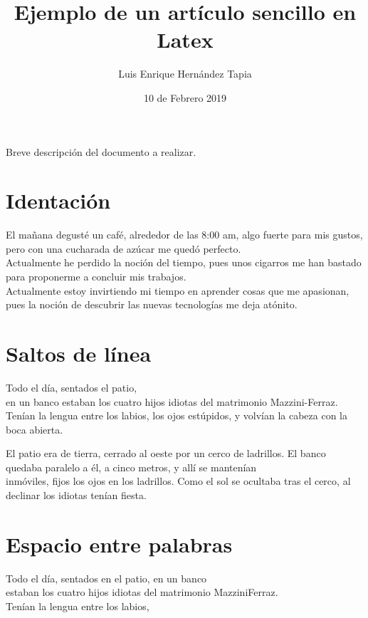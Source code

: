 \documentclass[12pt,latterpaper]{article}
\title{Ejemplo de un artículo sencillo en Latex}
\author{Luis Enrique Hernández Tapia}
\date{10 de Febrero 2019}
\begin{document}
\maketitle %

Breve descripción del documento a realizar.

\section{Identación}

\noindent El mañana degusté un café, alrededor de las 8:00 am, algo fuerte para mis gustos, pero con una cucharada de azúcar me quedó perfecto.\\

Actualmente he perdido la noción del tiempo, pues unos cigarros me han bastado para proponerme a concluir mis trabajos.\\

\noindent Actualmente estoy invirtiendo mi tiempo en aprender cosas que me apasionan, pues la noción de descubrir las nuevas tecnologías me deja atónito.


\section{Saltos de línea}

Todo el día, sentados el patio,\\ en un banco estaban los cuatro hijos
idiotas del matrimonio Mazzini-Ferraz. \newline Tenían la lengua
entre los labios, los ojos estúpidos, y volvían la cabeza con la boca
abierta.

\newpage

\par El patio era de tierra, cerrado al oeste por un cerco de ladrillos.
El banco quedaba paralelo a él, a cinco metros, y allí se mantenían
\\[.5cm]
inmóviles, fijos los ojos en los ladrillos.
Como el sol se ocultaba tras el cerco, al declinar los idiotas tenían
fiesta.


\section{Espacio entre palabras}

\noindent Todo el día, sentados \hfill en el patio, en un banco \\
estaban los cuatro hijos \hrulefill idiotas del matrimonio MazziniFerraz.\\
Tenían la lengua \dotfill entre los labios,
\end{document}
